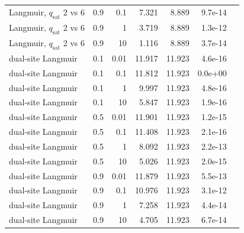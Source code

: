 \begin{tabular}{lrrrrrr}
Langmuir, $q_{\mathrm{sat}}$ 2 vs 6 & 0.9 & 0.1 & 7.321 & 8.889 & 9.7e-14 \\
Langmuir, $q_{\mathrm{sat}}$ 2 vs 6 & 0.9 & 1 & 3.719 & 8.889 & 1.3e-12 \\
Langmuir, $q_{\mathrm{sat}}$ 2 vs 6 & 0.9 & 10 & 1.116 & 8.889 & 3.7e-14 \\
dual-site Langmuir & 0.1 & 0.01 & 11.917 & 11.923 & 4.6e-16 \\
dual-site Langmuir & 0.1 & 0.1 & 11.812 & 11.923 & 0.0e+00 \\
dual-site Langmuir & 0.1 & 1 & 9.997 & 11.923 & 4.8e-16 \\
dual-site Langmuir & 0.1 & 10 & 5.847 & 11.923 & 1.9e-16 \\
dual-site Langmuir & 0.5 & 0.01 & 11.901 & 11.923 & 1.2e-15 \\
dual-site Langmuir & 0.5 & 0.1 & 11.408 & 11.923 & 2.1e-16 \\
dual-site Langmuir & 0.5 & 1 & 8.092 & 11.923 & 2.2e-13 \\
dual-site Langmuir & 0.5 & 10 & 5.026 & 11.923 & 2.0e-15 \\
dual-site Langmuir & 0.9 & 0.01 & 11.879 & 11.923 & 5.5e-13 \\
dual-site Langmuir & 0.9 & 0.1 & 10.976 & 11.923 & 3.1e-12 \\
dual-site Langmuir & 0.9 & 1 & 7.258 & 11.923 & 4.4e-14 \\
dual-site Langmuir & 0.9 & 10 & 4.705 & 11.923 & 6.7e-14 \\
\bottomrule
\end{tabular}
